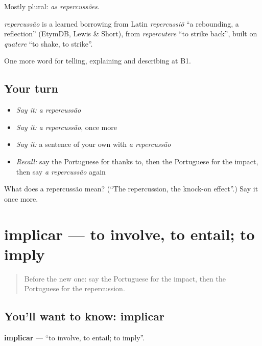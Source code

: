 Mostly plural: \emph{as repercussões}.

\begin{cousinweb}
\emph{repercussão} is a learned borrowing from Latin \emph{repercussiō} \textquotedblleft{}a rebounding, a reflection\textquotedblright{} (EtymDB, Lewis \& Short), from \emph{repercutere} \textquotedblleft{}to strike back\textquotedblright{}, built on \emph{quatere} \textquotedblleft{}to shake, to strike\textquotedblright{}.
\end{cousinweb}

\begin{grammarlens}[title={What you've built}]
One more word for telling, explaining and describing at B1.
\end{grammarlens}

\subsection*{Your turn}
\begin{itemize}
\raggedright
  \item \emph{Say it:} \emph{a repercussão}
  \item \emph{Say it:} \emph{a repercussão}, once more
  \item \emph{Say it:} a sentence of your own with \emph{a repercussão}
  \item \emph{Recall:} say the Portuguese for thanks to, then the Portuguese for the impact, then say \emph{a repercussão} again
\end{itemize}

\begin{tcolorbox}[breakable,colback=teal!4,colframe=teal!35!black,title={Before you move on}]
What does a repercussão mean? (\textquotedblleft{}The repercussion, the knock-on effect\textquotedblright{}.) Say it once more.
\end{tcolorbox}
\section[implicar]{implicar — to involve, to entail; to imply}

\label{lesson:PT-C351-implicar}



\begin{quote}
Before the new one: say the Portuguese for the impact, then the Portuguese for the repercussion.
\end{quote}

\subsection*{You'll want to know: implicar}
\textbf{implicar} — \textquotedblleft{}to involve, to entail; to imply\textquotedblright{}.

